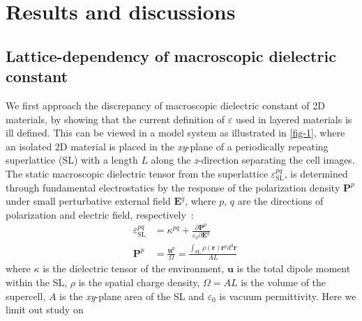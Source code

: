 
\section{Results and discussions}
\label{sec:diel-results-discussions}

\subsection{Lattice-dependency of macroscopic dielectric constant}
\label{sec:diel-latt-depend-macr}

We first approach the discrepancy of macroscopic dielectric constant
of 2D materials, by showing that the current definition of
$\varepsilon$ used in layered materials is ill defined.  This can be
viewed in a model system as illustrated
in  \autoref{fig-1}, where an isolated 2D material is placed in
the \textit{xy}-plane of a periodically repeating superlattice (SL)
with a length $L$ along the \textit{z}-direction separating the cell
images. The static macroscopic dielectric tensor from the superlattice
$\varepsilon_{\mathrm{SL}}^{pq}$, is determined through fundamental
electrostatics by the response of the polarization density
$\boldsymbol{P}^{p}$ under small perturbative external field
$\boldsymbol{E}^{q}$, where $p$, $q$ are the directions of
polarization and electric field,
respectively~\cite{Dressel_2001_electrodynamics}:
\begin{subequations}
  \begin{eqnarray}
      \label{eq:diele-def-eps-1}
    &\varepsilon_{\mathrm{SL}}^{pq} &= \kappa^{pq} +
                                 {\displaystyle \frac{\partial \boldsymbol{P}^{p}}
                                 {\varepsilon_{0} \partial \boldsymbol{E}^{q}}} \\
          \label{eq:diele-def-eps-2}
    &\boldsymbol{P}^{p} &=  {\displaystyle \frac{\boldsymbol{u}^{p}}{\Omega}}
                          = {\displaystyle \frac{{\displaystyle
          \int_{\mathrm{SL}} \rho(\boldsymbol{r}) \boldsymbol{r}^{p} d^{3}\boldsymbol{r}}}
                          {AL}}
  \end{eqnarray}
\end{subequations}
where $\kappa$ is the dielectric tensor of the environment,
$\boldsymbol{u}$ is the total dipole moment within the SL, $\rho$ is
the spatial charge density, $\Omega=AL$ is the volume of the
supercell, $A$ is the \textit{xy}-plane area of the SL and
$\varepsilon_{0}$ is vacuum permittivity. Here we limit out study on

